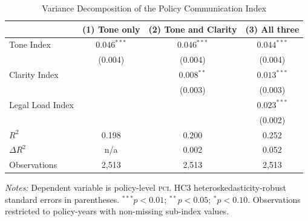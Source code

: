 \documentclass[12pt]{article}
\newcommand{\PCI}{\textsc{pci}}
\begin{document}
\begin{table}[H]
\centering
\caption{Variance Decomposition of the Policy Communication Index}
\label{tab:decomp}
\begin{threeparttable}
\small
\begin{tabular}{lccc}
\toprule
 & \textbf{(1) Tone only} & \textbf{(2) Tone and Clarity} & \textbf{(3) All three} \\
\midrule
Tone Index       & $0.046^{***}$ & $0.046^{***}$ & $0.044^{***}$ \\
                 & (0.004)       & (0.004)       & (0.004) \\
Clarity Index    &               & $0.008^{**}$  & $0.013^{***}$ \\
                 &               & (0.003)       & (0.003) \\
Legal Load Index &               &               & $0.023^{***}$ \\
                 &               &               & (0.002) \\
\addlinespace
$R^2$            & 0.198         & 0.200         & 0.252 \\
$\Delta R^2$     & n/a           & 0.002         & 0.052 \\
Observations     & 2,513         & 2,513         & 2,513 \\
\bottomrule
\end{tabular}
\begin{tablenotes}
\small
\item \textit{Notes:} Dependent variable is policy-level \PCI.  HC3
  heteroskedasticity-robust standard errors in parentheses.
  $^{***}p < 0.01$; $^{**}p < 0.05$; $^{*}p < 0.10$.
  Observations restricted to policy-years with non-missing sub-index values.
\end{tablenotes}
\end{threeparttable}
\end{table}
\end{document}
